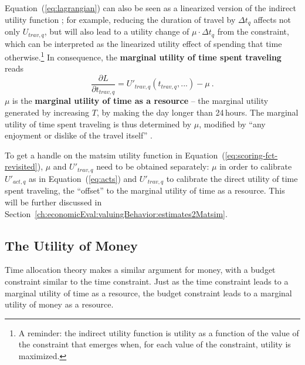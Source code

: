 Equation~(\ref{eq:lagrangian}) can also be seen as a linearized version of the indirect utility function%
%
%
%
; for example, reducing the duration of travel by $\Delta t_q$ affects not only $U_{trav,q}$, but will also lead to a utility change of $ \mu \cdot \Delta t_q$ from the constraint, which can be interpreted as the linearized utility effect of spending that time otherwise.\footnote{%
%
A reminder: the indirect utility function is utility as a function of the value of the constraint that emerges when, for each value of the constraint, utility is maximized.
%
}
%
In consequence, the \textbf{marginal utility of time spent traveling} reads
%
\begin{equation}
\frac{\partial L}{\partial t_{trav,q}} = U'_{trav,q}(t_{trav,q},...) - \mu \ .
\label{eq:marg-UoT}
\end{equation}
%
$\mu$ is the \textbf{marginal utility of time as a resource} -- the marginal utility generated by increasing $T$, \ie by making the day longer than 24\,hours. The marginal utility of time spent traveling is thus determined by $\mu$, modified by ``any enjoyment or dislike of the travel itself'' \citep{Small2012ValuationOfTimeRevisited}.

To get a handle on the \acrshort{matsim} utility function in Equation~(\ref{eq:scoring-fct-revisited}), $\mu$ and $U'_{trav,q}$ need to be obtained separately: $\mu$ in order to calibrate $U'_{act,q}$ as in Equation~(\ref{eq:acts}) and $U'_{trav,q}$ to calibrate the direct utility of time spent traveling, the ``offset'' to the marginal utility of time as a resource.
%
This will be further discussed in Section~\ref{ch:economicEval:valuingBehavior:estimates2Matsim}.


\subsection{The Utility of Money}
\label{ch:economicEval:valuingBehavior:uom}
Time allocation theory \citep{DeSerpa1997economicsOfTime, Jara-DiazGuevara-2003} makes a similar argument for money, with a budget constraint similar to the time constraint.
%
Just as the time constraint leads to a marginal utility of time as a resource, the budget constraint leads to a marginal utility of money as a resource.

